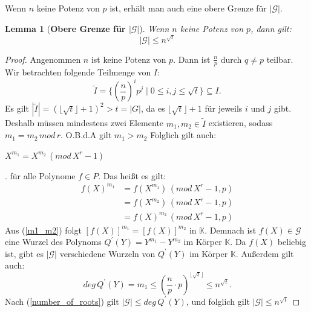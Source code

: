 \documentclass[12pt,oneside]{article}
\newtheorem{lemma}[theorem]{Lemma}
\theoremstyle{remark}
\theoremstyle{definition}
\begin{document}
Wenn $n$ keine Potenz von $p$ ist, erhält man auch eine obere Grenze für $|\mathcal{G}|$.

\begin{lemma}[\textbf{Obere Grenze für $|\mathcal{G}|$}]
Wenn $n$ keine Potenz von $p$, dann gilt:
\begin{equation}
    |\mathcal{G}| \leq  n^{\sqrt{t}}
\end{equation}
\end{lemma}

\begin{proof}
Angenommen $n$ ist keine Potenz von $p$. Dann ist $\frac{n}{p}$ durch $q \neq p$ teilbar. Wir betrachten folgende Teilmenge von $I$:
\begin{equation}
    \widetilde{I} = \{ (\frac{n}{p})^i p^j \mid 0 \leq i,j \leq \sqrt{t}\} \subseteq I.
\end{equation}
Es gilt $|\widetilde{I}| = (\lfloor \sqrt{t} \rfloor + 1)^2 > t = |G|$, da es $ \lfloor \sqrt{t} \rfloor + 1$ für jeweils $i$ und $j$ gibt. Deshalb müssen mindestens zwei Elemente $m_1,m_2 \in \widetilde{I}$ existieren, sodass $m_1 = m_2 \, mod \, r$. O.B.d.A gilt $m_1 > m_2 $ Folglich gilt auch:\newline\newline
\centerline{$X^{m_1} = X^{m_2} \, (mod \, X^r - 1)$}.
für alle Polynome $ f \in P$. Das heißt es gilt:\newline
\begin{equation}\label{m1_m2}
    \begin{aligned}
         f(X)^{m_1} &= f(X^{m_1}) \, (mod \, X^r - 1, p) \\
        &= f(X^{m_2}) \, (mod \, X^r - 1,p) \\
        &= f(X)^{m_2} \, (mod \, X^r - 1,p)
    \end{aligned}
\end{equation}
Aus (\ref{m1_m2}) folgt $[f(X)]^{m_1} = [f(X)]^{m_2}$ in $\mathbb{K}$. Demnach ist $f(X) \in  \mathcal{G}$ eine Wurzel des Polynoms $Q^{'}(Y) = Y^{m_1} - Y^{m_2}$ im Körper $\mathbb{K}$. Da $f(X)$ beliebig ist, gibt es $|\mathcal{G}|$ verschiedene Wurzeln von $Q^{'}(Y)$ im Körper $\mathbb{K}$. Außerdem gilt auch:
\begin{equation}\label{degQ}
    deg \, Q^{'}(Y) = m_1 \leq (\frac{n}{p} \cdot p)^{\lfloor \sqrt{t} \rfloor} \leq n^{\sqrt{t}}. 
\end{equation}
Nach (\ref{number_of_roots}) gilt $|\mathcal{G}| \leq deg \, Q^{'}(Y)$, und folglich gilt $|\mathcal{G}| \leq n^{\sqrt{t}}$
\end{proof}
\end{document}
